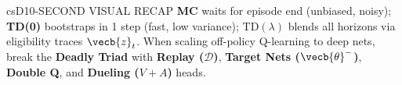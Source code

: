 \documentclass[../../../../master.tex]{subfiles}
\begin{document}
\begin{cscolumns}
\begin{cscard}{csD}{10-SECOND VISUAL RECAP}
  \sffamily\footnotesize
  \textbf{MC} waits for episode end (unbiased, noisy); \textbf{TD(0)} bootstraps in 1 step (fast, low variance); \textbf{$\mathrm{TD}(\lambda)$} blends all horizons via eligibility traces $\vecb{z}_t$.
  When scaling off-policy Q-learning to deep nets, break the \textbf{Deadly Triad} with \textbf{Replay ($\mathcal{D}$)}, \textbf{Target Nets ($\vecb{\theta}^-$)}, \textbf{Double Q}, and \textbf{Dueling ($V+A$)} heads.
\end{cscard}
\end{cscolumns}

\csend
\end{document}
